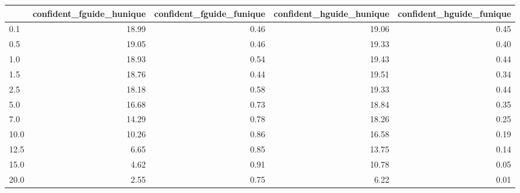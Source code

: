 \begin{tabular}{lrrrr}
\toprule
 & confident_fguide_hunique & confident_fguide_funique & confident_hguide_hunique & confident_hguide_funique \\
\midrule
0.1 & 18.99 & 0.46 & 19.06 & 0.45 \\
0.5 & 19.05 & 0.46 & 19.33 & 0.40 \\
1.0 & 18.93 & 0.54 & 19.43 & 0.44 \\
1.5 & 18.76 & 0.44 & 19.51 & 0.34 \\
2.5 & 18.18 & 0.58 & 19.33 & 0.44 \\
5.0 & 16.68 & 0.73 & 18.84 & 0.35 \\
7.0 & 14.29 & 0.78 & 18.26 & 0.25 \\
10.0 & 10.26 & 0.86 & 16.58 & 0.19 \\
12.5 & 6.65 & 0.85 & 13.75 & 0.14 \\
15.0 & 4.62 & 0.91 & 10.78 & 0.05 \\
20.0 & 2.55 & 0.75 & 6.22 & 0.01 \\
\bottomrule
\end{tabular}

